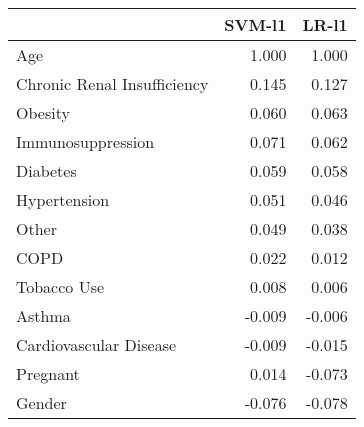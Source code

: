 \begin{tabular}{lrr}
\toprule
{} &  SVM-l1 &  LR-l1 \\
\midrule
Age                         &   1.000 &  1.000 \\
Chronic Renal Insufficiency &   0.145 &  0.127 \\
Obesity                     &   0.060 &  0.063 \\
Immunosuppression           &   0.071 &  0.062 \\
Diabetes                    &   0.059 &  0.058 \\
Hypertension                &   0.051 &  0.046 \\
Other                       &   0.049 &  0.038 \\
COPD                        &   0.022 &  0.012 \\
Tobacco Use                 &   0.008 &  0.006 \\
Asthma                      &  -0.009 & -0.006 \\
Cardiovascular Disease      &  -0.009 & -0.015 \\
Pregnant                    &   0.014 & -0.073 \\
Gender                      &  -0.076 & -0.078 \\
\bottomrule
\end{tabular}
